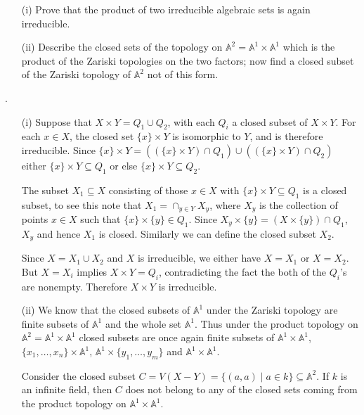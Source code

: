 \documentclass[12pt]{article}
\begin{document}
\begin{prob}
    \begin{enumerate}
        \item[(i)] Prove that the product of two irreducible algebraic sets is again irreducible.
        \item[(ii)] Describe the closed sets of the topology on $\mathbb{A}^2 = \mathbb{A}^1 \times \mathbb{A}^1$ which is the product of the Zariski topologies on the two factors; now find a closed subset of the Zariski topology of $\mathbb{A}^2$ not of this form.
    \end{enumerate}
\end{prob}

\sol.
\begin{enumerate}
    \item[(i)] Suppose that $X \times Y = Q_1 \cup Q_2$, with each $Q_i$ a closed subset of $X \times Y$.
        For each $x \in X$, the closed set $\{x\} \times Y$ is isomorphic to $Y$, and is therefore irreducible.
        Since $\{x\} \times Y= ((\{x\} \times Y) \cap Q_1) \cup ((\{x\} \times Y ) \cap Q_2)$ either $\{x\} \times Y \subseteq Q_1$ or else $\{x\} \times Y \subseteq Q_2$.

        The subset $X_1 \subseteq X$ consisting of those $x \in X$ with $\{x\} \times Y \subseteq Q_1$ is a closed subset, to see this note that $X_1 = \cap_{y \in Y} X_y$, where $X_y$ is the collection of points $x \in X$ such that $\{x\} \times \{y\} \in Q_1$. Since $X_y \times \{y\} = (X \times \{y\}) \cap Q_1$, $X_y$ and hence $X_1$ is closed. Similarly we can define the closed subset $X_2$.

        Since $X = X_1 \cup X_2$ and $X$ is irreducible, we either have $X = X_1$ or $X = X_2$. But $X = X_i$ implies $X \times Y = Q_i$, contradicting the fact the both of the $Q_i$'s are nonempty. Therefore $X \times Y$ is irreducible.

    \item[(ii)] We know that the closed subsets of $\mathbb{A}^1$ under the Zariski topology are finite subsets of $\mathbb{A}^1$ and the whole set $\mathbb{A}^1$. Thus under the product topology on $\mathbb{A}^2 = \mathbb{A}^1 \times \mathbb{A}^1$ closed subsets are once again finite subsets of $\mathbb{A}^1 \times \mathbb{A}^1$, $\{x_1,\dots,x_n\} \times \mathbb{A}^1$, $\mathbb{A}^1 \times \{y_1,\dots,y_m\}$ and $\mathbb{A}^1 \times \mathbb{A}^1$.

        Consider the closed subset $C = V(X-Y) = \{(a,a) \mid a \in k\} \subseteq \mathbb{A}^2$. If $k$ is an infinite field, then $C$ does not belong to any of the closed sets coming from the product topology on $\mathbb{A}^1 \times \mathbb{A}^1$.
\end{enumerate}
\end{document}
